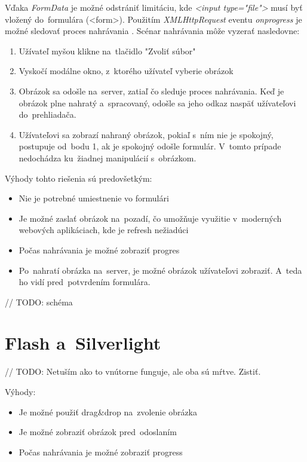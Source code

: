 Vďaka \emph{FormData} je možné odstrániť limitáciu, kde \emph{<input type="file"\textgreater} musí byť vložený do~formulára (<form\textgreater). Použitím \emph{XMLHttpRequest} eventu \emph{onprogress} je možné sledovať proces nahrávania \cite{MDN_XMLHttpRequest_progress}. Scénar nahrávania môže vyzerať nasledovne:
\begin{enumerate}
	\item Užívateľ myšou klikne na~tlačidlo "Zvoliť súbor"
	\item Vyskočí modálne okno, z~ktorého užívateľ vyberie obrázok
	\item Obrázok sa odošle na~server, zatiaľ čo sleduje proces nahrávania. Keď je obrázok plne nahratý a~spracovaný, odošle sa jeho odkaz naspäť užívateľovi do~prehliadača.
	\item Užívateľovi sa zobrazí nahraný obrázok, pokiaľ s~ním nie je spokojný, postupuje od~bodu 1, ak je spokojný odošle formulár. V~tomto prípade nedochádza ku~žiadnej manipulácií s~obrázkom.
\end{enumerate}

Výhody tohto riešenia sú predovšetkým:
\begin{itemize}
	\item Nie je potrebné umiestnenie vo formulári
	\item Je možné zaslať obrázok na~pozadí, čo umožňuje využitie v~moderných webových aplikáciach, kde je refresh nežiadúci
	\item Počas nahrávania je možné zobraziť progres
	\item Po~nahratí obrázka na~server, je možné obrázok užívateľovi zobraziť. A~teda ho vidí pred~potvrdením formulára.
\end{itemize}

// TODO: schéma


\section{Flash a~Silverlight}

// TODO: Netuším ako to vnútorne funguje, ale oba sú mŕtve. Zistiť.

Výhody:
\begin{itemize}
	\item Je možné použiť drag&drop na~zvolenie obrázka
	\item Je možné zobraziť obrázok pred~odoslaním
	\item Počas nahrávania je možné zobraziť progress
\end{itemize}